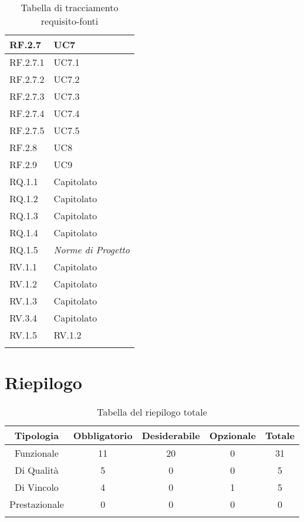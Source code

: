 \begin{center}
\begin{longtable}{|C{6cm}|C{6cm}|}
    RF.2.7 & UC7 \\ \hline
    RF.2.7.1 & UC7.1 \\ \hline
    RF.2.7.2 & UC7.2 \\ \hline
    RF.2.7.3 & UC7.3 \\ \hline
    RF.2.7.4 & UC7.4 \\ \hline
    RF.2.7.5 & UC7.5 \\ \hline
    RF.2.8 & UC8 \\ \hline
    RF.2.9 & UC9 \\ \hline
    RQ.1.1 & Capitolato \\ \hline
    RQ.1.2 & Capitolato \\ \hline
    RQ.1.3 & Capitolato \\ \hline
    RQ.1.4 & Capitolato \\ \hline
    RQ.1.5 & \textit{Norme di Progetto} \\ \hline
    RV.1.1 & Capitolato \\ \hline
    RV.1.2 & Capitolato \\ \hline
    RV.1.3 & Capitolato \\ \hline
    RV.3.4 & Capitolato \\ \hline
    RV.1.5 & RV.1.2 \\ \hline

    \caption{Tabella di tracciamento requisito-fonti}
  \end{longtable}
\end{center}


\section{Riepilogo}

\begin{center}
  \centering
  \begin{longtable}{|c|c|c|c|c|}
    \hline
    \rowcolor[HTML]{036400}
    {\color[HTML]{FFFFFF} \textbf{Tipologia}} & {\color[HTML]{FFFFFF} \textbf{Obbligatorio}} & {\color[HTML]{FFFFFF} \textbf{Desiderabile}} & {\color[HTML]{FFFFFF} \textbf{Opzionale}}  & {\color[HTML]{FFFFFF} \textbf{Totale}} \\ \hline
    \rowcolor[HTML]{EFEFEF}
    Funzionale & 11 & 20 & 0 & 31 \\ \hline
    \rowcolor[HTML]{C0C0C0}
    Di Qualità & 5 & 0 & 0 & 5 \\ \hline
    \rowcolor[HTML]{EFEFEF}
    Di Vincolo & 4 & 0 & 1 & 5 \\ \hline
    \rowcolor[HTML]{C0C0C0}
    Prestazionale & 0 & 0 & 0 & 0 \\ \hline

    \caption{Tabella del riepilogo totale}
  \end{longtable}
\end{center}
